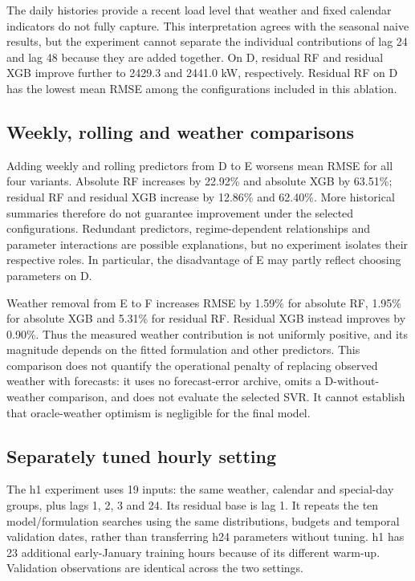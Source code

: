 The daily histories provide a recent load level that weather and fixed calendar indicators do not fully capture. This interpretation agrees with the seasonal naive results, but the experiment cannot separate the individual contributions of lag 24 and lag 48 because they are added together. On D, residual RF and residual XGB improve further to \num{2429.3} and \num{2441.0} kW, respectively. Residual RF on D has the lowest mean RMSE among the configurations included in this ablation.

\subsection{Weekly, rolling and weather comparisons}
Adding weekly and rolling predictors from D to E worsens mean RMSE for all four variants. Absolute RF increases by \num{22.92}\% and absolute XGB by \num{63.51}\%; residual RF and residual XGB increase by \num{12.86}\% and \num{62.40}\%. More historical summaries therefore do not guarantee improvement under the selected configurations. Redundant predictors, regime-dependent relationships and parameter interactions are possible explanations, but no experiment isolates their respective roles. In particular, the disadvantage of E may partly reflect choosing parameters on D.

Weather removal from E to F increases RMSE by \num{1.59}\% for absolute RF, \num{1.95}\% for absolute XGB and \num{5.31}\% for residual RF. Residual XGB instead improves by \num{0.90}\%. Thus the measured weather contribution is not uniformly positive, and its magnitude depends on the fitted formulation and other predictors. This comparison does not quantify the operational penalty of replacing observed weather with forecasts: it uses no forecast-error archive, omits a D-without-weather comparison, and does not evaluate the selected SVR. It cannot establish that oracle-weather optimism is negligible for the final model.

\subsection{Separately tuned hourly setting}
The h1 experiment uses 19 inputs: the same weather, calendar and special-day groups, plus lags 1, 2, 3 and 24. Its residual base is lag 1. It repeats the ten model/formulation searches using the same distributions, budgets and temporal validation dates, rather than transferring h24 parameters without tuning. h1 has 23 additional early-January training hours because of its different warm-up. Validation observations are identical across the two settings.

